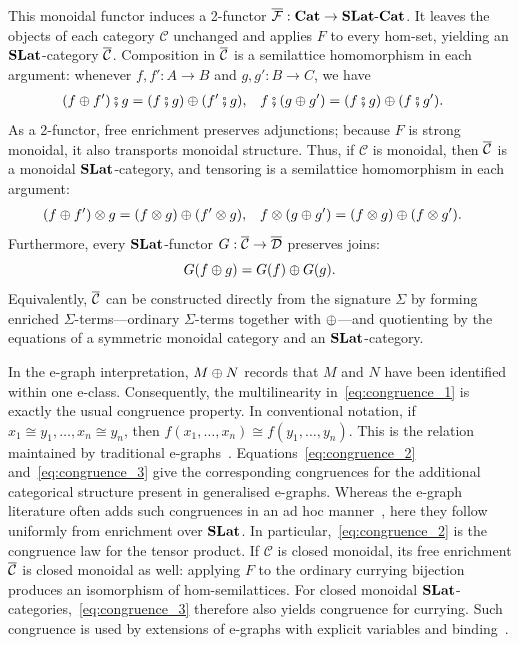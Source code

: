 This monoidal functor induces a 2-functor ${\overline{\mathcal{F}}} : \mathbf{Cat} \to \mathbf{SLat}\text{-}\mathbf{Cat}$.
It leaves the objects of each category $\mathcal{C}$ unchanged and applies $F$ to every hom-set, yielding an $\mathbf{SLat}$-category ${\overline{\mathcal{C}}}$.
Composition in ${\overline{\mathcal{C}}}$ is a semilattice homomorphism in each argument: whenever $f,f' : A \to B$ and $g,g' : B \to C$, we have
\begin{align}
(f \mathbin{\oplus} f') \fatsemi g
  &= (f \fatsemi g) \mathbin{\oplus} (f' \fatsemi g),
&
f \fatsemi (g \mathbin{\oplus} g')
  &= (f \fatsemi g) \mathbin{\oplus} (f \fatsemi g').
\label{eq:congruence_1}
\end{align}
As a 2-functor, free enrichment preserves adjunctions; because $F$ is strong monoidal, it also transports monoidal structure.
Thus, if $\mathcal{C}$ is monoidal, then ${\overline{\mathcal{C}}}$ is a monoidal $\mathbf{SLat}$-category, and tensoring is a semilattice homomorphism in each argument:
\begin{align}
(f \mathbin{\oplus} f') \otimes g
  &= (f \otimes g) \mathbin{\oplus} (f' \otimes g),
&
f \otimes (g \mathbin{\oplus} g')
  &= (f \otimes g) \mathbin{\oplus} (f \otimes g').
\label{eq:congruence_2}
\end{align}
Furthermore, every $\mathbf{SLat}$-functor $G : {\overline{\mathcal{C}}} \to {\overline{\mathcal{D}}}$ preserves joins:
\begin{equation}
G(f \mathbin{\oplus} g) = G(f) \mathbin{\oplus} G(g).
\label{eq:congruence_3}
\end{equation}
Equivalently, ${\overline{\mathcal{C}}}$ can be constructed directly from the signature $\Sigma$ by forming enriched $\Sigma$-terms---ordinary $\Sigma$-terms together with $\mathbin{\oplus}$---and quotienting by the equations of a symmetric monoidal category and an $\mathbf{SLat}$-category.

In the e-graph interpretation, $M \mathbin{\oplus} N$ records that $M$ and $N$ have been identified within one e-class.
Consequently, the multilinearity in~\cref{eq:congruence_1} is exactly the usual congruence property.
In conventional notation, if $x_1 \cong y_1, \ldots, x_n \cong y_n$, then $f(x_1, \ldots, x_n) \cong f(y_1, \ldots, y_n)$.
This is the relation maintained by traditional e-graphs~\cite{EggPaper}.
Equations~\eqref{eq:congruence_2} and~\eqref{eq:congruence_3} give the corresponding congruences for the additional categorical structure present in generalised e-graphs.
Whereas the e-graph literature often adds such congruences in an ad hoc manner~\cite{slotted-egraphs}, here they follow uniformly from enrichment over $\mathbf{SLat}$.
In particular,~\cref{eq:congruence_2} is the congruence law for the tensor product.
If $\mathcal{C}$ is closed monoidal, its free enrichment ${\overline{\mathcal{C}}}$ is closed monoidal as well: applying $F$ to the ordinary currying bijection produces an isomorphism of hom-semilattices.
For closed monoidal $\mathbf{SLat}$-categories,~\cref{eq:congruence_3} therefore also yields congruence for currying.
Such congruence is used by extensions of e-graphs with explicit variables and binding~\cite{slotted-egraphs,tiurin2026categoricalegraphslambdacalculi}.

